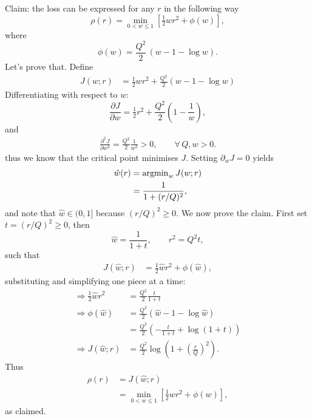 \documentclass[onecolumn,floatfix]{aastex631}
\begin{document}
Claim: the loss can be expressed for any $r$ in the following way
\begin{equation}
    \rho(r) = \min_{0<w\leq1} \left[ \tfrac{1}{2} w r^2 + \phi(w) \right],
\end{equation}
where
\begin{equation}
    \phi(w) = \frac{Q^2}{2}\,(w - 1 - \log w).
\end{equation}
Let's prove that. Define
\begin{align}
    J\left( w ; r \right) &= \tfrac{1}{2} w r^2 + \tfrac{Q^2}{2} \left( w - 1 - \log{w}\right)
\end{align}
Differentiating with respect to $w$:
\begin{equation}
    \frac{\partial J}{\partial w} 
    = \tfrac{1}{2}r^2 + \frac{Q^2}{2}\left(1 - \frac{1}{w}\right),
\end{equation}
and
\begin{align}
    \frac{\partial^2 J}{\partial w^2} = \frac{Q^2}{2} \frac{1}{w^2} > 0, \qquad \forall \, Q,w > 0.
\end{align}
thus we know that the critical point minimises $J$.
Setting $\partial_w J=0$ yields
\begin{align}
    \hat{w}(r) &= {\rm argmin}_w \, J (w ; r) \\
    &= \frac{1}{1 + (r/Q)^2},
\end{align}
and note that $\hat{w} \in (0, 1]$ because $(r/Q)^2 \geq 0$.
We now prove the claim. First set $t = (r/Q)^2 \geq 0$, then
\begin{equation}
    \hat{w} = \frac{1}{1+t}, \qquad r^2 = Q^2 t,
\end{equation}
such that
\begin{align}
    J (\hat{w} ; r) &= \tfrac{1}{2} \hat{w} r^2 + \phi(\hat{w}),
\end{align}
substituting and simplifying one piece at a time:
\begin{align}
    \Rightarrow \tfrac{1}{2} \hat{w} r^2 &= \frac{Q^2}{2} \frac{t}{1 + t} \\
    \Rightarrow \phi(\hat{w}) &= \frac{Q^2}{2} \left( \hat{w} - 1 - \log{\hat{w}} \right) \\
    &= \frac{Q^2}{2} \left( -\frac{t}{1 + t} + \log(1 + t) \right) \\
    \Rightarrow J (\hat{w} ; r) &= \frac{Q^2}{2} \log{\left( 1 + \left( \tfrac{r}{Q}\right)^2 \right)}.
\end{align}
Thus
\begin{align}
    \rho(r) &= J ( \hat{w} ; r ) \\
    &= \min_{0<w\leq1} \left[ \tfrac{1}{2} w r^2 + \phi(w) \right],
\end{align}
as claimed.
\end{document}

